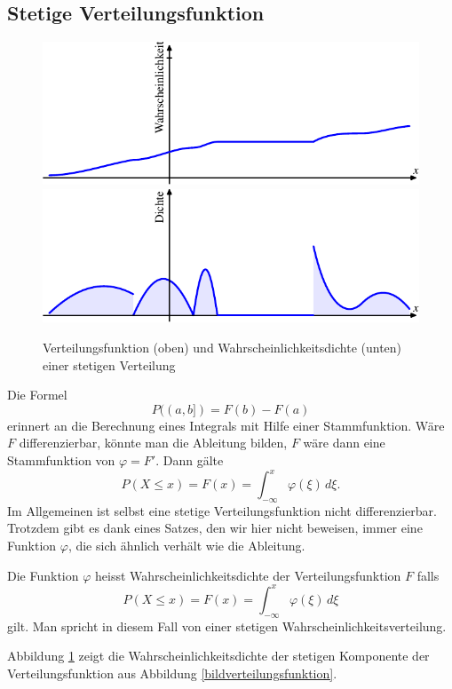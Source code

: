 \subsection{Stetige Verteilungsfunktion}
\begin{figure}
\begin{center}
\includegraphics{images/verteilungsfunktion-4}
\includegraphics{images/verteilungsfunktion-6}
\end{center}
\caption{Verteilungsfunktion (oben) und Wahrscheinlichkeitsdichte 
(unten) einer stetigen Verteilung\label{bildstetigeverteilungsfunktion}}
\end{figure}
Die Formel
\[
P((a,b])=F(b)-F(a)
\]
erinnert an die Berechnung eines Integrals mit Hilfe einer
Stammfunktion.
Wäre $F$ differenzierbar, könnte man die Ableitung bilden,
$F$ wäre dann eine Stammfunktion von $\varphi=F'$.
Dann gälte
\[
P(X\le x)=F(x)=\int_{-\infty}^x\varphi(\xi)\,d\xi.
\]
Im Allgemeinen ist selbst eine stetige Verteilungsfunktion nicht
differenzierbar.
Trotzdem gibt es dank eines Satzes, den wir hier nicht beweisen,
immer eine Funktion $\varphi$, die sich ähnlich verhält wie die
Ableitung.
\begin{definition}
Die Funktion $\varphi$ heisst Wahrscheinlichkeitsdichte der Verteilungsfunktion
$F$ falls
\[
P(X\le x)=F(x)=\int_{-\infty}^x\varphi(\xi)\,d\xi
\]
gilt.
Man spricht in diesem Fall von einer stetigen Wahrscheinlichkeitsverteilung.
\end{definition}
Abbildung \ref{bildstetigeverteilungsfunktion} zeigt die
Wahrscheinlichkeitsdichte der stetigen Komponente der Verteilungsfunktion
aus Abbildung \ref{bildverteilungsfunktion}.

